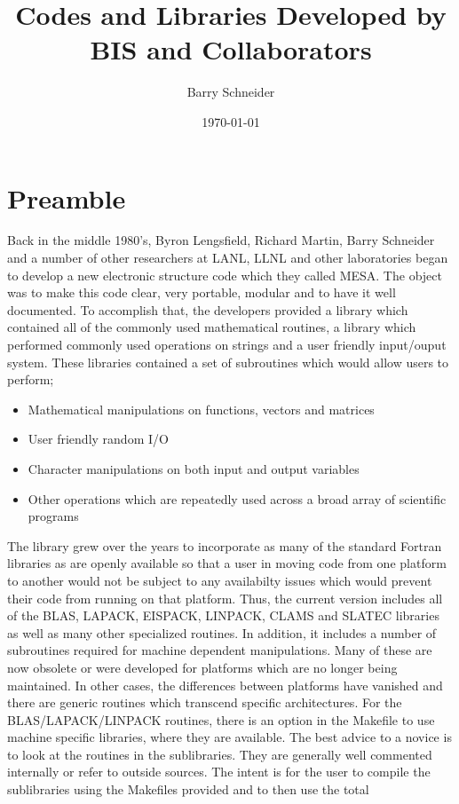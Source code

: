\documentclass[onecolumn,letterpaper]{report}
\title{Codes and Libraries Developed by BIS and Collaborators }
\author{Barry Schneider}
\date{\today}
\begin{document}
\maketitle
\section{Preamble}
Back in the middle 1980's, Byron Lengsfield, Richard Martin, Barry Schneider and a
number of other researchers at LANL, LLNL and other laboratories began to develop a 
new electronic structure code which they called MESA.  The object was to make this 
code clear, very portable, modular and to have it well documented.  To accomplish that, 
the developers provided a library which contained all of the commonly used mathematical 
routines, a library which performed commonly used operations on strings and a user 
friendly input/ouput system.  These libraries contained a set of subroutines which would 
allow users to perform;
\begin{itemize}
\item Mathematical manipulations on functions, vectors and 
matrices
\item User friendly random I/O
\item Character manipulations on both input and output variables 
\item Other operations which are repeatedly used across a broad
array of scientific programs
\end{itemize}
The library grew over the years to incorporate as many 
of the standard Fortran libraries as are openly available so that a user in 
moving code from one platform to another would not be subject to any availabilty issues 
which would prevent their code from running on that platform.  Thus, the current 
version includes all of the BLAS, LAPACK, EISPACK, LINPACK, CLAMS and
SLATEC libraries as well as many other specialized routines.  In addition, it includes a 
number of subroutines required for machine dependent manipulations.  Many of these are now
obsolete or were developed for platforms which are no longer being maintained.  In other 
cases, the differences between platforms have vanished and there are generic routines 
which transcend specific architectures.  For the BLAS/LAPACK/LINPACK routines, there is 
an option in the Makefile to use machine specific libraries, where they are available.
The best advice to a novice is to look at the routines in the sublibraries.  They are 
generally well commented internally or refer to outside sources.  The intent is for the 
user to compile the sublibraries using the Makefiles provided and to then use the total 
\end{document}
